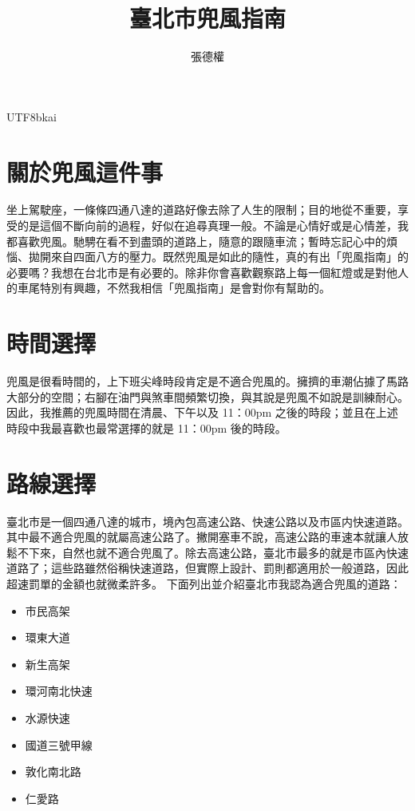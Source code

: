 \documentclass[a4paper, 12pt, oneside]{article}
\begin{document}
\begin{CJK}{UTF8}{bkai} %

\title{臺北市兜風指南}
\author[1]{張德權}






\date{}
\maketitle

\section*{關於兜風這件事}
坐上駕駛座，一條條四通八達的道路好像去除了人生的限制；目的地從不重要，享受的是這個不斷向前的過程，好似在追尋真理一般。不論是心情好或是心情差，我都喜歡兜風。馳騁在看不到盡頭的道路上，隨意的跟隨車流；暫時忘記心中的煩惱、拋開來自四面八方的壓力。既然兜風是如此的隨性，真的有出「兜風指南」的必要嗎？我想在台北市是有必要的。除非你會喜歡觀察路上每一個紅燈或是對他人的車尾特別有興趣，不然我相信「兜風指南」是會對你有幫助的。
\section*{時間選擇}
兜風是很看時間的，上下班尖峰時段肯定是不適合兜風的。擁擠的車潮佔據了馬路大部分的空間；右腳在油門與煞車間頻繁切換，與其說是兜風不如說是訓練耐心。因此，我推薦的兜風時間在清晨、下午以及 11：00pm 之後的時段；並且在上述時段中我最喜歡也最常選擇的就是 11：00pm 後的時段。
\section*{路線選擇}
臺北市是一個四通八達的城市，境內包高速公路、快速公路以及市區内快速道路。其中最不適合兜風的就屬高速公路了。撇開塞車不說，高速公路的車速本就讓人放鬆不下來，自然也就不適合兜風了。除去高速公路，臺北市最多的就是市區內快速道路了；這些路雖然俗稱快速道路，但實際上設計、罰則都適用於一般道路，因此超速罰單的金額也就微柔許多。
下面列出並介紹臺北市我認為適合兜風的道路：
\begin{itemize}
	\item 市民高架
	\item 環東大道
	\item 新生高架
	\item 環河南北快速
	\item 水源快速
	\item 國道三號甲線
	\item 敦化南北路
	\item 仁愛路
\end{itemize}

\end{CJK}
\end{document}
